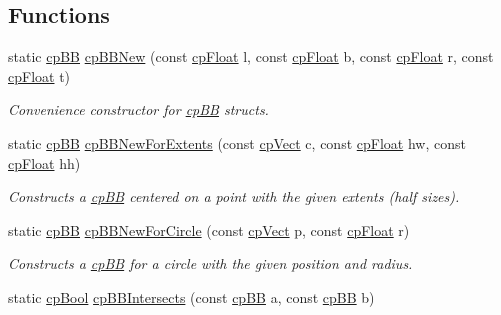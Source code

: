 \subsection*{Functions}
\begin{DoxyCompactItemize}
\item 
\hypertarget{group__cp_b_b_b_ga3282803074394675a42a881f5e965541}{}static \hyperlink{structcp_b_b}{cp\+B\+B} \hyperlink{group__cp_b_b_b_ga3282803074394675a42a881f5e965541}{cp\+B\+B\+New} (const \hyperlink{group__basic_types_gac1ed65573e035bf892505768c852d8d3}{cp\+Float} l, const \hyperlink{group__basic_types_gac1ed65573e035bf892505768c852d8d3}{cp\+Float} b, const \hyperlink{group__basic_types_gac1ed65573e035bf892505768c852d8d3}{cp\+Float} r, const \hyperlink{group__basic_types_gac1ed65573e035bf892505768c852d8d3}{cp\+Float} t)\label{group__cp_b_b_b_ga3282803074394675a42a881f5e965541}

\begin{DoxyCompactList}\small\item\em Convenience constructor for \hyperlink{structcp_b_b}{cp\+B\+B} structs. \end{DoxyCompactList}\item 
\hypertarget{group__cp_b_b_b_ga2c2321269da85794ab1ace999afc1485}{}static \hyperlink{structcp_b_b}{cp\+B\+B} \hyperlink{group__cp_b_b_b_ga2c2321269da85794ab1ace999afc1485}{cp\+B\+B\+New\+For\+Extents} (const \hyperlink{structcp_vect}{cp\+Vect} c, const \hyperlink{group__basic_types_gac1ed65573e035bf892505768c852d8d3}{cp\+Float} hw, const \hyperlink{group__basic_types_gac1ed65573e035bf892505768c852d8d3}{cp\+Float} hh)\label{group__cp_b_b_b_ga2c2321269da85794ab1ace999afc1485}

\begin{DoxyCompactList}\small\item\em Constructs a \hyperlink{structcp_b_b}{cp\+B\+B} centered on a point with the given extents (half sizes). \end{DoxyCompactList}\item 
\hypertarget{group__cp_b_b_b_gaff0810056e31d1f3d66abf88dccf0f4d}{}static \hyperlink{structcp_b_b}{cp\+B\+B} \hyperlink{group__cp_b_b_b_gaff0810056e31d1f3d66abf88dccf0f4d}{cp\+B\+B\+New\+For\+Circle} (const \hyperlink{structcp_vect}{cp\+Vect} p, const \hyperlink{group__basic_types_gac1ed65573e035bf892505768c852d8d3}{cp\+Float} r)\label{group__cp_b_b_b_gaff0810056e31d1f3d66abf88dccf0f4d}

\begin{DoxyCompactList}\small\item\em Constructs a \hyperlink{structcp_b_b}{cp\+B\+B} for a circle with the given position and radius. \end{DoxyCompactList}\item 
\hypertarget{group__cp_b_b_b_gac4a5fd7846b67f8711d3afb7536adbd5}{}static \hyperlink{group__basic_types_gabc5e752c48f3449ca26ef413ecbd647e}{cp\+Bool} \hyperlink{group__cp_b_b_b_gac4a5fd7846b67f8711d3afb7536adbd5}{cp\+B\+B\+Intersects} (const \hyperlink{structcp_b_b}{cp\+B\+B} a, const \hyperlink{structcp_b_b}{cp\+B\+B} b)\label{group__cp_b_b_b_gac4a5fd7846b67f8711d3afb7536adbd5}


\end{DoxyCompactItemize}
